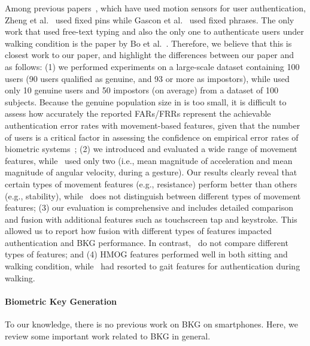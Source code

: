 Among previous papers~\cite{zheng2012,gascon2014,bo2013}, which have used motion sensors for user authentication, Zheng et al.~\cite{zheng2012} used fixed pins while Gascon et al.~\cite{gascon2014} used fixed phrases. The only work that used free-text typing and also the only one to authenticate users under walking condition is the paper by Bo et al.~\cite{bo2013}. Therefore, we believe that this is closest work to our paper, and highlight the differences between our paper and~\cite{bo2013} as follows: (1) we performed experiments on a large-scale dataset containing 100 users (90 users qualified as genuine, and  93 or more as impostors), while \cite{bo2013} used only 10 genuine users and 50 impostors (on average) from a dataset of 100 subjects. Because the genuine population size in \cite{bo2013} is too small, it is difficult to assess how accurately the reported FARs/FRRs represent the achievable authentication error rates with movement-based features, given that the number of users is a critical factor in assessing the confidence on empirical error rates of biometric systems~\cite{DassZJ06}; 
(2) we introduced and evaluated a wide range of movement features, while~\cite{bo2013} used only two (i.e., mean magnitude of acceleration and mean magnitude of angular velocity, during a gesture). Our results clearly reveal that certain types of movement features (e.g., resistance) perform better than others (e.g., stability), while~\cite{bo2013} does not distinguish between different types of movement features; (3) our evaluation is comprehensive and includes detailed comparison and fusion with additional features such as touchscreen tap and keystroke. This allowed us to report how fusion with different types of features impacted authentication and BKG performance. In contrast,~\cite{bo2013} do not compare different types of features; and (4) HMOG features performed well in both sitting and walking condition, while~\cite{bo2013} had resorted to gait features for authentication during walking.

%

%

%
 
%
%
%
%

%
%
%
%
%
%
%
%

%
%
%
%
%

%

%

%
%
%
%



\paragraph{Biometric Key Generation} 
To our knowledge, there is no previous work on BKG on smartphones. Here, we review some important work related to BKG in general. 

